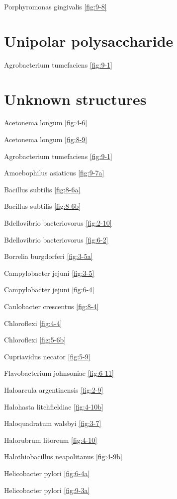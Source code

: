 \documentclass[]{tufte-book}
\begin{document}
Porphyromonas gingivalis \ref{fig:9-8}

\hypertarget{unipolar-polysaccharide}{%
\section*{Unipolar polysaccharide}\label{unipolar-polysaccharide}}

Agrobacterium tumefaciens \ref{fig:9-1}

\hypertarget{unknown-structures}{%
\section*{Unknown structures}\label{unknown-structures}}

Acetonema longum \ref{fig:4-6}

Acetonema longum \ref{fig:8-9}

Agrobacterium tumefaciens \ref{fig:9-1}

Amoebophilus asiaticus \ref{fig:9-7a}

Bacillus subtilis \ref{fig:8-6a}

Bacillus subtilis \ref{fig:8-6b}

Bdellovibrio bacteriovorus \ref{fig:2-10}

Bdellovibrio bacteriovorus \ref{fig:6-2}

Borrelia burgdorferi \ref{fig:3-5a}

Campylobacter jejuni \ref{fig:3-5}

Campylobacter jejuni \ref{fig:6-4}

Caulobacter crescentus \ref{fig:8-4}

Chloroflexi \ref{fig:4-4}

Chloroflexi \ref{fig:5-6b}

Cupriavidus necator \ref{fig:5-9}

Flavobacterium johnsoniae \ref{fig:6-11}

Haloarcula argentinensis \ref{fig:2-9}

Halohasta litchfieldiae \ref{fig:4-10b}

Haloquadratum walsbyi \ref{fig:3-7}

Halorubrum litoreum \ref{fig:4-10}

Halothiobacillus neapolitanus \ref{fig:4-9b}

Helicobacter pylori \ref{fig:6-4a}

Helicobacter pylori \ref{fig:9-3a}
\end{document}
